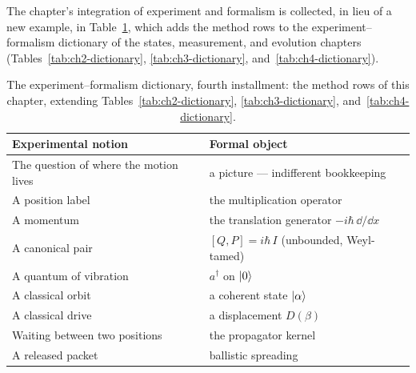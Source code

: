 The chapter's integration of experiment and formalism is collected, in lieu of a new example, in Table~\ref{tab:ch5-dictionary}, which adds the method rows to the experiment--formalism dictionary of the states, measurement, and evolution chapters (Tables~\ref{tab:ch2-dictionary}, \ref{tab:ch3-dictionary}, and~\ref{tab:ch4-dictionary}).

\begin{table}[htbp!]
    \centering
    \caption{The experiment--formalism dictionary, fourth installment: the method rows of this chapter, extending Tables~\ref{tab:ch2-dictionary}, \ref{tab:ch3-dictionary}, and~\ref{tab:ch4-dictionary}.}
    \label{tab:ch5-dictionary}
    \begin{tabular}{ll}
        \toprule
        Experimental notion & Formal object \\
        \midrule
        The question of where the motion lives & a picture --- indifferent bookkeeping \\
        A position label & the multiplication operator \\
        A momentum & the translation generator $-i\hbar\,\dd/\dd x$ \\
        A canonical pair & $[Q,P] = i\hbar\,I$ (unbounded, Weyl-tamed) \\
        A quantum of vibration & $a^\dagger$ on $\ket{0}$ \\
        A classical orbit & a coherent state $\ket{\alpha}$ \\
        A classical drive & a displacement $D(\beta)$ \\
        Waiting between two positions & the propagator kernel \\
        A released packet & ballistic spreading \\
        \bottomrule
    \end{tabular}
\end{table}


